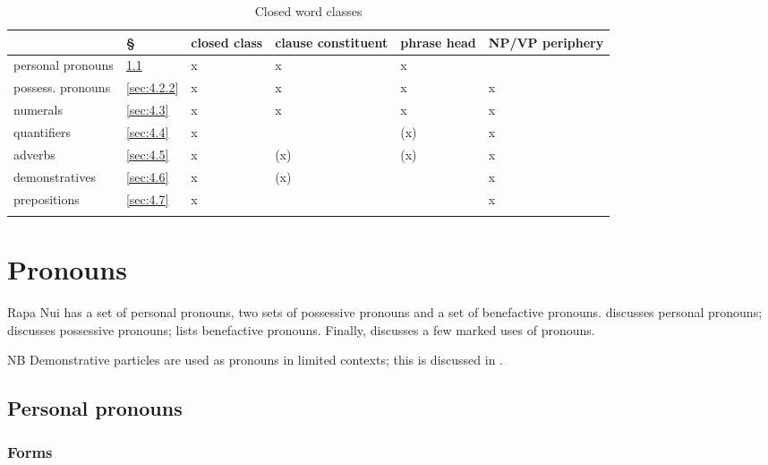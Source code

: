 \begin{table}
\begin{tabularx}{\textwidth}{XZ{9mm}Z{13mm}Z{18mm}Z{13mm}Z{16mm}}
\lsptoprule
& § & closed class & clause constituent & phrase head & NP/VP \newline periphery\\
\midrule
{personal pronouns} & \ref{sec:4.2.1}& x& x& x& \\
{possess. pronouns} & \ref{sec:4.2.2}& x& x& x& x\\
numerals & \ref{sec:4.3}& x& x& x& x\\
{quantifiers} & \ref{sec:4.4}& x&  & (x)& x\\
{adverbs} & \ref{sec:4.5}& x& (x)& (x)& x\\
{demonstratives} & \ref{sec:4.6}& x& (x)&  & x\\
{prepositions} & \ref{sec:4.7}& x&  &  & x\\
\lspbottomrule
\end{tabularx}
\caption{Closed word classes}
\label{tab:17}
\end{table}

\section{Pronouns}\label{sec:4.2}

Rapa Nui has a set of personal pronouns, two sets of possessive pronouns and a set of benefactive pronouns.  discusses personal pronouns;  discusses possessive pronouns;  lists benefactive pronouns. Finally,  discusses a few marked uses of pronouns.

NB Demonstrative particles are used as pronouns in limited contexts; this is discussed in .

\subsection{Personal pronouns}\label{sec:4.2.1}
\subsubsection[Forms]{Forms}\label{sec:4.2.1.1}

